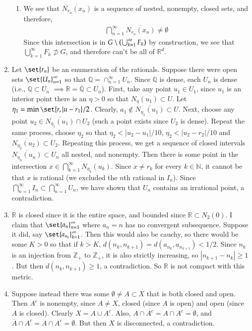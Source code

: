 \documentclass[12pt]{article}
\def\mbb#1{\mathbb{#1}}
\def\bN{\mbb{N}}
\def \R{\mbb{R}}
\def\bQ{\mbb{Q}}
\def\bZ{\mbb{Z}}
\theoremstyle{definition}
\theoremstyle{remark}
\begin{document}
\begin{enumerate}[leftmargin=\labelsep]
\begin{enumerate}
			\item We see that $\overline{N_{r_n}(x_n)}$ is a sequence of nested, nonempty, closed sets, and therefore,
			\begin{align*}
				\bigcap_{n=1}^\infty \overline{N_{r_n}(x_n)} \neq \emptyset
			\end{align*}
			Since this intersection is in $G \setminus \qty(\bigcup_{k=1}^\infty F_k)$ by construction, we see that $\bigcup_{k=1}^\infty F_k \not \supset G$, and therefore can't be all of $\R^d$.
		\end{enumerate}
		
		\item Let $\set{r_n}$ be an enumeration of the rationals. Suppose there were open sets $\set{U_n}_{n=1}^\infty$ so that $\bQ = \cap_{n=1}^\infty U_n$. Since $\bQ$ is dense, each $U_n$ is dense (i.e., $\bQ \subset U_n$ $\implies \R = \overline{\bQ} \subset \overline{U_n}$). First, take any point $u_1 \in U_1$, since $u_1$ is an interior point there is an $\eta > 0$ so that $N_\eta(u_1) \subset U$. Let $\eta_1 = \min\set{r, |u-r_1}/2$. Clearly, $a_1 \not \in \overline{N_{\eta_1}(u_1)} \subset U$. Next, choose any point $u_2 \in \overline{N_{\eta_1}(u_1)} \cap U_2$ (such a point exists since $U_2$ is dense). Repeat the same process, choose $\eta_2$ so that $\eta_2 < |u_2 - u_1|/10$, $\eta_2 < |u_2-r_2|/10$ and $\overline{N_{\eta_2}(u_2)} \subset U_2$. Repeating this process, we get a sequence of closed intervals $\overline{N_{\eta_n}(u_n)} \subset U_n$ all nested, and nonempty. Then there is some point in the intersection $x \in \bigcap_{k=1}^\infty N_{\eta_k}(u_k)$. Since $x \neq r_k$ for every $k \in \bN$, it cannot be that $x$ is rational (we excluded the $n$th rational in $I_n$). Since $\bigcap_{n=1}^\infty I_n \subset \bigcap_{n=1}^\infty U_n$, we have shown that $U_n$ contains an irrational point, a contradiction.
		
		\item $\R$ is closed since it is the entire space, and bounded since $\R \subset N_2(0)$. I claim that $\set{a_n}_{n=1}^\infty$ where $a_n=n$ has no convergent subsequence. Suppose it did, say $\set{a_{n_k}}_{k=1}^\infty$. Then this would also be cauchy, so there would be some $K > 0$ so that if $k > K$, $d(n_k, n_{k+1})=d(a_{n_k}, a_{n_{k+1}}) < 1/2$. Since $n_k$ is an injection from $\bZ_+$ to $\bZ_+$, it is also strictly increasing, so $|n_{k+1} - n_k| \geq 1$. But then $d(n_k, n_{k+1}) \geq 1$, a contradiction. So $\R$ is not compact with this metric.
		
		\item Suppose instead there was some $\emptyset \neq A \subset X$ that is both closed and open. Then $A^c$ is nonempty, since $A \neq X$, closed (since $A$ is open) and open (since $A$ is closed). Clearly $X = A \cup A^c$. Also, $A \cap \overline{A^c} = A \cap A^c = \emptyset$, and $\overline{A} \cap A^c = A \cap A^c = \emptyset$. But then $X$ is disconnected, a contradiction.
		

\end{enumerate}
\end{document}
